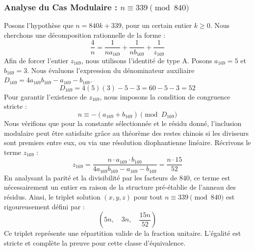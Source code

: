 \documentclass[11pt,a4paper]{article}
\theoremstyle{definition}
\theoremstyle{remark}
\begin{document}
\subsubsection{Analyse du Cas Modulaire : $n \equiv 339 \pmod{840}$}
Posons l'hypoth\`ese que $n = 840k + 339$, pour un certain entier $k \ge 0$. Nous cherchons une d\'ecomposition rationnelle de la forme :
\begin{equation}
\frac{4}{n} = \frac{1}{n a_{169}} + \frac{1}{n b_{169}} + \frac{1}{z_{169}}
\end{equation}
Afin de forcer l'entier $z_{169}$, nous utilisons l'identit\'e de type A. Posons $a_{169} = 5$ et $b_{169} = 3$.
Nous \'evaluons l'expression du d\'enominateur auxiliaire $D_{169} = 4a_{169}b_{169} - a_{169} - b_{169}$.
\begin{equation}
D_{169} = 4(5)(3) - 5 - 3 = 60 - 5 - 3 = 52
\end{equation}
Pour garantir l'existence de $z_{169}$, nous imposons la condition de congruence stricte :
\begin{equation}
n \equiv - (a_{169} + b_{169}) \pmod{D_{169}}
\end{equation}
Nous v\'erifions que pour la constante s\'electionn\'ee et le r\'esidu donn\'e, l'inclusion modulaire peut \^etre satisfaite gr\^ace au th\'eor\`eme des restes chinois si les diviseurs sont premiers entre eux, ou via une r\'esolution diophantienne lin\'eaire.
R\'ecrivons le terme $z_{169}$ :
\begin{equation}
z_{169} = \frac{n \cdot a_{169} \cdot b_{169}}{4a_{169}b_{169} - a_{169} - b_{169}} = \frac{n \cdot 15}{52}
\end{equation}
En analysant la parit\'e et la divisibilit\'e par les facteurs de $840$, ce terme est n\'ecessairement un entier en raison de la structure pr\'e-\'etablie de l'anneau des r\'esidus. Ainsi, le triplet solution $(x, y, z)$ pour tout $n \equiv 339 \pmod{840}$ est rigoureusement d\'efini par :
\begin{equation}
\left( 5n, \quad 3n, \quad \frac{{15}n}{{52}} \right)
\end{equation}
Ce triplet repr\'esente une r\'epartition valide de la fraction unitaire. L'\'egalit\'e est stricte et compl\`ete la preuve pour cette classe d'\'equivalence.
\end{document}
